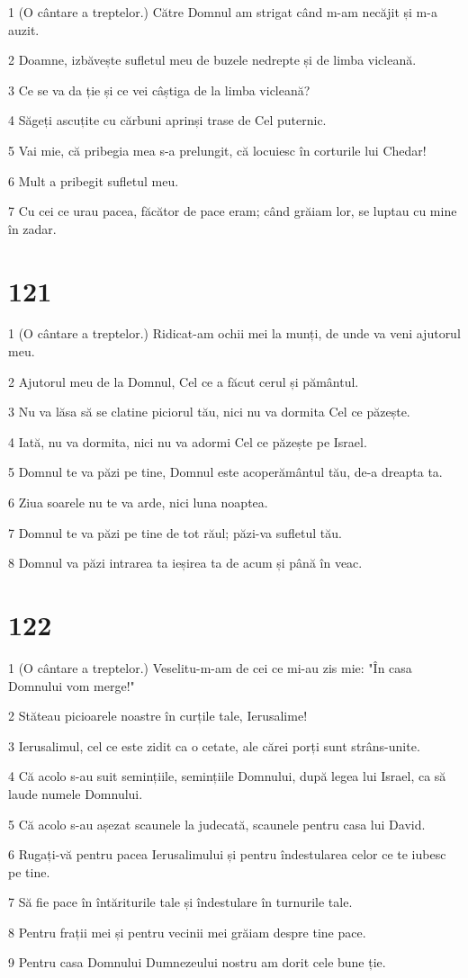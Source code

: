 \par 1 (O cântare a treptelor.) Către Domnul am strigat când m-am necăjit și m-a auzit.
\par 2 Doamne, izbăvește sufletul meu de buzele nedrepte și de limba vicleană.
\par 3 Ce se va da ție și ce vei câștiga de la limba vicleană?
\par 4 Săgeți ascuțite cu cărbuni aprinși trase de Cel puternic.
\par 5 Vai mie, că pribegia mea s-a prelungit, că locuiesc în corturile lui Chedar!
\par 6 Mult a pribegit sufletul meu.
\par 7 Cu cei ce urau pacea, făcător de pace eram; când grăiam lor, se luptau cu mine în zadar.

\chapter{121}

\par 1 (O cântare a treptelor.) Ridicat-am ochii mei la munți, de unde va veni ajutorul meu.
\par 2 Ajutorul meu de la Domnul, Cel ce a făcut cerul și pământul.
\par 3 Nu va lăsa să se clatine piciorul tău, nici nu va dormita Cel ce păzește.
\par 4 Iată, nu va dormita, nici nu va adormi Cel ce păzește pe Israel.
\par 5 Domnul te va păzi pe tine, Domnul este acoperământul tău, de-a dreapta ta.
\par 6 Ziua soarele nu te va arde, nici luna noaptea.
\par 7 Domnul te va păzi pe tine de tot răul; păzi-va sufletul tău.
\par 8 Domnul va păzi intrarea ta ieșirea ta de acum și până în veac.

\chapter{122}

\par 1 (O cântare a treptelor.) Veselitu-m-am de cei ce mi-au zis mie: "În casa Domnului vom merge!"
\par 2 Stăteau picioarele noastre în curțile tale, Ierusalime!
\par 3 Ierusalimul, cel ce este zidit ca o cetate, ale cărei porți sunt strâns-unite.
\par 4 Că acolo s-au suit semințiile, semințiile Domnului, după legea lui Israel, ca să laude numele Domnului.
\par 5 Că acolo s-au așezat scaunele la judecată, scaunele pentru casa lui David.
\par 6 Rugați-vă pentru pacea Ierusalimului și pentru îndestularea celor ce te iubesc pe tine.
\par 7 Să fie pace în întăriturile tale și îndestulare în turnurile tale.
\par 8 Pentru frații mei și pentru vecinii mei grăiam despre tine pace.
\par 9 Pentru casa Domnului Dumnezeului nostru am dorit cele bune ție.


